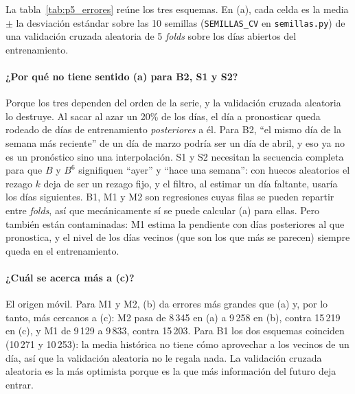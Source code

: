 La tabla~\ref{tab:p5_errores} reúne los tres esquemas. En (a), cada celda es
la media $\pm$ la desviación estándar sobre las 10 semillas
(\texttt{SEMILLAS\_CV} en \texttt{semillas.py}) de una validación cruzada
aleatoria de 5 \emph{folds} sobre los días abiertos del entrenamiento.

\begin{table}[H]
  \centering
  \small
  \caption{MAE y RMSE en libras: (a) validación cruzada aleatoria de 5
  \emph{folds} en el entrenamiento, con 10 semillas; (b) origen móvil semanal
  en el entrenamiento, orígenes de mayo a septiembre; (c) origen móvil
  semanal en la prueba.}
  \label{tab:p5_errores}
\end{table}

\paragraph{¿Por qué no tiene sentido (a) para B2, S1 y S2?} Porque los tres
dependen del orden de la serie, y la validación cruzada aleatoria lo destruye.
Al sacar al azar un 20\% de los días, el día a pronosticar queda rodeado de
días de entrenamiento \emph{posteriores} a él. Para B2, ``el mismo día de la
semana más reciente'' de un día de marzo podría ser un día de abril, y eso ya
no es un pronóstico sino una interpolación. S1 y S2 necesitan la secuencia
completa para que $B$ y $B^6$ signifiquen ``ayer'' y ``hace una semana'': con
huecos aleatorios el rezago $k$ deja de ser un rezago fijo, y el filtro, al
estimar un día faltante, usaría los días siguientes. B1, M1 y M2 son
regresiones cuyas filas se pueden repartir entre \emph{folds}, así que
mecánicamente sí se puede calcular (a) para ellas. Pero también están
contaminadas: M1 estima la pendiente con días posteriores al que pronostica, y
el nivel de los días vecinos (que son los que más se parecen) siempre queda
en el entrenamiento.

\paragraph{¿Cuál se acerca más a (c)?} El origen móvil. Para M1 y M2, (b)
da errores más grandes que (a) y, por lo tanto, más cercanos a (c): M2 pasa
de 8\,345 en (a) a 9\,258 en (b), contra 15\,219 en (c), y M1 de 9\,129 a
9\,833, contra 15\,203. Para B1 los dos esquemas coinciden (10\,271 y
10\,253): la media histórica no tiene cómo aprovechar a los vecinos de un
día, así que la validación aleatoria no le regala nada. La validación cruzada aleatoria es
la más optimista porque es la que más información del futuro deja entrar.

